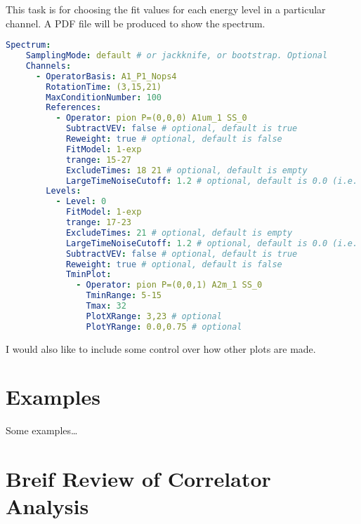 \documentclass[12pt,letterpaper,notitlepage]{article}
\begin{document}
This task is for choosing the fit values for each energy level in a particular channel.
A \textsc{PDF} file will be produced to show the spectrum.
\begin{lstlisting}[language=yaml]
  Spectrum:
    SamplingMode: default # or jackknife, or bootstrap. Optional
    Channels:
      - OperatorBasis: A1_P1_Nops4
        RotationTime: (3,15,21)
        MaxConditionNumber: 100
        References:
          - Operator: pion P=(0,0,0) A1um_1 SS_0
            SubtractVEV: false # optional, default is true
            Reweight: true # optional, default is false
            FitModel: 1-exp
            trange: 15-27
            ExcludeTimes: 18 21 # optional, default is empty
            LargeTimeNoiseCutoff: 1.2 # optional, default is 0.0 (i.e. no cutoff)
        Levels:
          - Level: 0
            FitModel: 1-exp
            trange: 17-23
            ExcludeTimes: 21 # optional, default is empty
            LargeTimeNoiseCutoff: 1.2 # optional, default is 0.0 (i.e. no cutoff)
            SubtractVEV: false # optional, default is true
            Reweight: true # optional, default is false
            TminPlot:
              - Operator: pion P=(0,0,1) A2m_1 SS_0
                TminRange: 5-15
                Tmax: 32
                PlotXRange: 3,23 # optional
                PlotYRange: 0.0,0.75 # optional
\end{lstlisting}
I would also like to include some control over how other plots are made.


\section{Examples}

Some examples\ldots

\newpage
\appendix

\section{Breif Review of Correlator Analysis}
\label{appsec:review}
\end{document}
